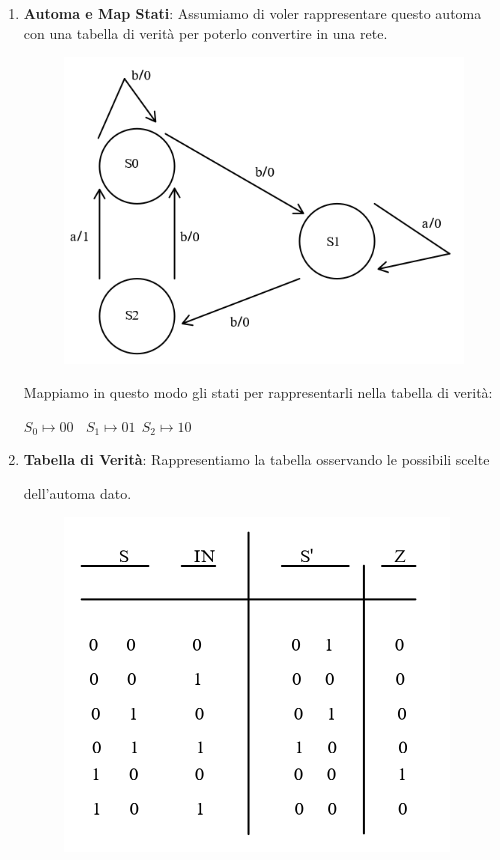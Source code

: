 \documentclass{article}
\begin{document}
\begin{enumerate}
    \item \textbf{Automa e Map Stati}: Assumiamo di voler rappresentare questo automa con una tabella di verità per poterlo convertire in una rete.
    \begin{figure}[htbp]
    \includegraphics[scale=0.5]{img/automa1.png}
    \centering
\end{figure}

Mappiamo in questo modo gli stati per rappresentarli nella tabella di verità:

    $ S_{0} \mapsto 00 \: \:
    \: \: S_{1} \mapsto 01 \: \:
     S_{2} \mapsto 10 $

    \newpage
        
    \item \textbf{Tabella di Verità}: Rappresentiamo la tabella osservando le possibili scelte 
    
    dell'automa dato.
    \begin{figure}[htbp]
        \includegraphics[scale=0.5]{img/TV_automa1.png}
        \centering
    \end{figure}
    

\end{enumerate}
\end{document}
